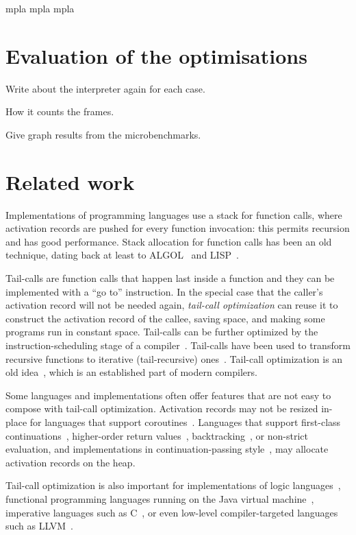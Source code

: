 \documentclass[diploma]{softlab-thesis}
\begin{document}
mpla mpla mpla 

\chapter {Evaluation of the optimisations}
\label{ch:evaluation}

Write about the interpreter again for each case.

How it counts the frames. 

Give graph results from the microbenchmarks.

\chapter{Related work}
\label{ch:related}

Implementations of programming languages use a stack for function calls, 
where activation records are pushed for every function invocation: this permits recursion 
and has good performance. Stack allocation for function calls has been an old technique, 
dating back at least to ALGOL~\cite{Dijkstra60,Naur78} and LISP~\cite{McCarthy60,Stoyan79}.

Tail-calls are function calls that happen last inside a function and
they can be implemented with a ``go to'' instruction. In the special
case that the caller's activation record will not be needed again,
\emph{tail-call optimization} can reuse it to construct the activation
record of the callee, saving space, and making some programs run in
constant space. Tail-calls can be further optimized by the
instruction-scheduling stage of a compiler~\cite[\S12.4.3]{Torczon12}.
Tail-calls have been used to transform recursive functions to
iterative (tail-recursive)
ones~\cite[\S{9}]{McCarthy62}\cite{Barron68}.  Tail-call optimization
is an old idea~\cite[p.~7]{Gill65}\cite[p.~21]{Knuth74}, which is an
established part of modern compilers.

Some languages and implementations often offer features that are not
easy to compose with tail-call optimization. Activation records may
not be resized in-place for languages that support
coroutines~\cite[p.~60]{Waite84}. Languages that support first-class
continuations~\cite{Sperber10}, higher-order return
values~\cite[p.~103]{Appel92}\cite{Steele78},
backtracking~\cite{Bobrow73}, or non-strict evaluation, and
implementations in continuation-passing style~\cite[p.~103]{Appel92},
may allocate activation records on the heap. 

Tail-call optimization is also important for implementations of logic languages~\cite{Bigot99},
functional programming languages running on the Java virtual machine~\cite{Madsen:2018:TCE:3178372.3179499},
imperative languages such as C~\cite{Probst01}, or even low-level compiler-targeted languages such as
LLVM~\cite{Pandey:2015:LC:2842773}.
\end{document}
